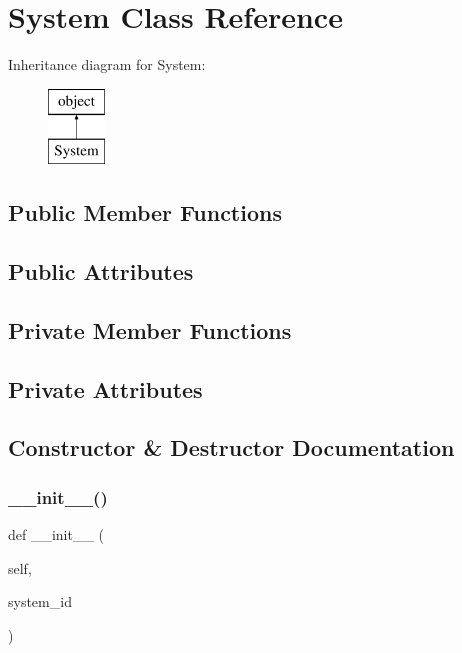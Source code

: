 \hypertarget{classopenbu_1_1system_1_1_system}{}\section{System Class Reference}
\label{classopenbu_1_1system_1_1_system}
Inheritance diagram for System\+:\begin{figure}[H]
\begin{center}
\leavevmode
\includegraphics[height=2.000000cm]{classopenbu_1_1system_1_1_system}
\end{center}
\end{figure}
\subsection*{Public Member Functions}
\subsection*{Public Attributes}
\subsection*{Private Member Functions}
\subsection*{Private Attributes}


\subsection{Constructor \& Destructor Documentation}
\mbox{\label{classopenbu_1_1system_1_1_system_ac19e48a2be8ad2bcdf557c3f8b5c41e9}} 
\subsubsection{\texorpdfstring{\+\_\+\+\_\+init\+\_\+\+\_\+()}{\_\_init\_\_()}}
{\footnotesize\ttfamily def \+\_\+\+\_\+init\+\_\+\+\_\+ (\begin{DoxyParamCaption}\item[{}]{self,  }\item[{}]{system\+\_\+id }\end{DoxyParamCaption})}



